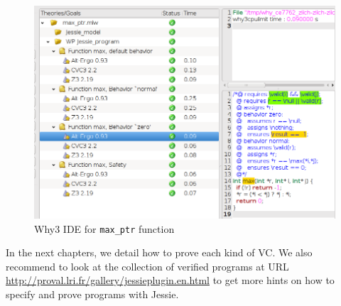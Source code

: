 \documentclass[a4paper,11pt,twoside,openright]{report}
\begin{document}
\begin{figure}[t]
  \begin{center}
    \includegraphics[width=\linewidth]{jessie/max_ptr_why3ide.png}
  \end{center}
  \caption{Why3 IDE for \texttt{max\_ptr} function}
  \label{fig:max_ptr:ide}
\end{figure}



In the next chapters, we detail how to prove each kind of VC.
We also recommend to
look at the collection of verified programs at URL
\url{http://proval.lri.fr/gallery/jessieplugin.en.html} to get more hints
on how to specify and prove programs with Jessie.
\end{document}
